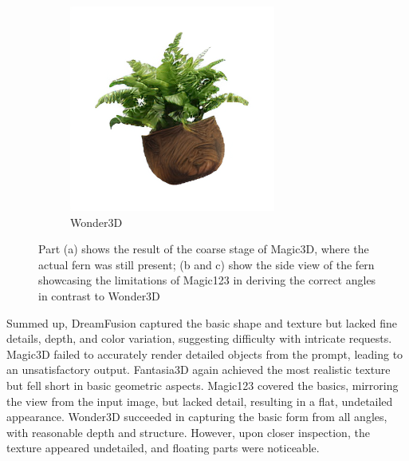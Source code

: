 \begin{figure}[ht]
\begin{subfigure}[b]{0.32\textwidth}
        \includegraphics[width=\textwidth]{etc/a high-quality rendering of a fern in a wooden pot/wonder3D/rgb_000_right.png}
        \caption{Wonder3D}
    \end{subfigure}
    \caption{Part (a) shows the result of the coarse stage of Magic3D, where the actual fern was still present; (b and c) show the side view of the fern showcasing the limitations of Magic123 in deriving the correct angles in contrast to Wonder3D}\label{fig:fernSideview}
  \end{figure}

Summed up, DreamFusion captured the basic shape and texture but lacked fine details, depth, and color variation, suggesting difficulty with intricate requests. Magic3D failed to accurately render detailed objects from the prompt, leading to an unsatisfactory output. Fantasia3D again achieved the most realistic texture but fell short in basic geometric aspects. Magic123 covered the basics, mirroring the view from the input image, but lacked detail, resulting in a flat, undetailed appearance. Wonder3D succeeded in capturing the basic form from all angles, with reasonable depth and structure. However, upon closer inspection, the texture appeared undetailed, and floating parts were noticeable.\\




